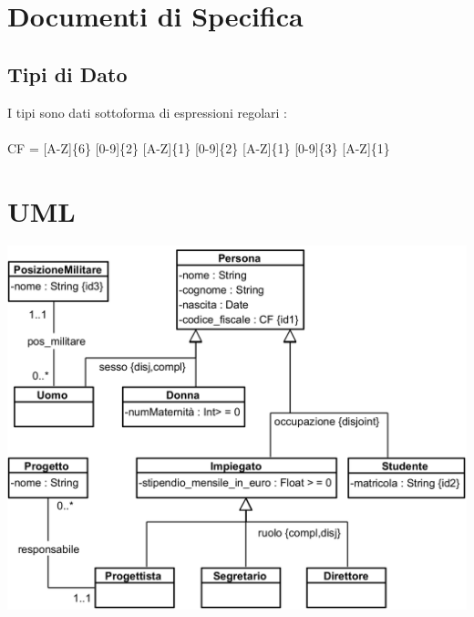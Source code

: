 \documentclass[12pt, letterpaper]{article}
\newcommand{\acc}{\\\hphantom{}\\}
\begin{document}
\section{Documenti di Specifica}
\subsection{Tipi di Dato}
I tipi sono dati sottoforma di espressioni regolari : \acc
CF = [A-Z]\{6\} [0-9]\{2\} [A-Z]\{1\} [0-9]\{2\} [A-Z]\{1\} [0-9]\{3\} [A-Z]\{1\}

\section{UML}\begin{center}
    \includegraphics[width=\textwidth]{images/UML.png}
\end{center}
\end{document}
